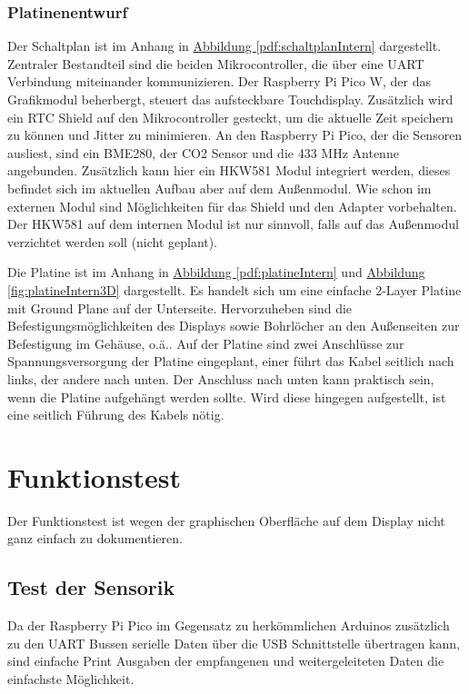 \documentclass[a4paper,11pt]{article}
\newcounter{subsubsubsection}[subsubsection]
\begin{document}
\subsubsection{Platinenentwurf}
\label{subsubsub:platinenentwurfExtern} 

\label{subsubsubsub:schaltplanExtern}

Der Schaltplan ist im Anhang in \hyperref[pdf:schaltplanIntern]{Abbildung \ref{pdf:schaltplanIntern}} dargestellt. Zentraler Bestandteil sind die beiden Mikrocontroller, 
die über eine UART Verbindung miteinander kommunizieren. Der Raspberry Pi Pico W, der das Grafikmodul beherbergt, steuert das aufsteckbare Touchdisplay. Zusätzlich wird
ein RTC Shield auf den Mikrocontroller gesteckt, um die aktuelle Zeit speichern zu können und Jitter zu minimieren. 
An den Raspberry Pi Pico, der die Sensoren ausliest, sind ein BME280, der CO2 Sensor und die 433 MHz Antenne angebunden. Zusätzlich kann hier ein HKW581 Modul integriert werden, 
dieses befindet sich im aktuellen Aufbau aber auf dem Außenmodul. Wie schon im externen Modul sind Möglichkeiten für das Shield und den Adapter vorbehalten. 
Der HKW581 auf dem internen Modul ist nur sinnvoll, falls auf das Außenmodul verzichtet werden soll (nicht geplant).

\label{subsubsubsub:platineExtern}

Die Platine ist im Anhang in \hyperref[pdf:platineIntern]{Abbildung \ref{pdf:platineIntern}} und \hyperref[fig:platineIntern3D]{Abbildung \ref{fig:platineIntern3D}} dargestellt. Es handelt sich um eine einfache 2-Layer Platine mit Ground Plane
auf der Unterseite. Hervorzuheben sind die Befestigungsmöglichkeiten des Displays sowie Bohrlöcher an den Außenseiten zur Befestigung im Gehäuse, o.ä..
Auf der Platine sind zwei Anschlüsse zur Spannungsversorgung der Platine eingeplant, einer führt das Kabel seitlich nach links, der andere nach unten. 
Der Anschluss nach unten kann praktisch sein, wenn die Platine aufgehängt werden sollte. Wird diese hingegen aufgestellt, ist eine seitlich Führung des Kabels nötig. 


\section{Funktionstest}
\label{sub:funktionstest}

Der Funktionstest ist wegen der graphischen Oberfläche auf dem Display nicht ganz einfach zu dokumentieren. 

\subsection{Test der Sensorik}
\label{subsub:test-sensorik}
Da der Raspberry Pi Pico im Gegensatz zu herkömmlichen Arduinos zusätzlich zu den UART Bussen serielle Daten über die USB Schnittstelle übertragen kann, 
sind einfache Print Ausgaben der empfangenen und weitergeleiteten Daten die einfachste Möglichkeit. 
\end{document}
